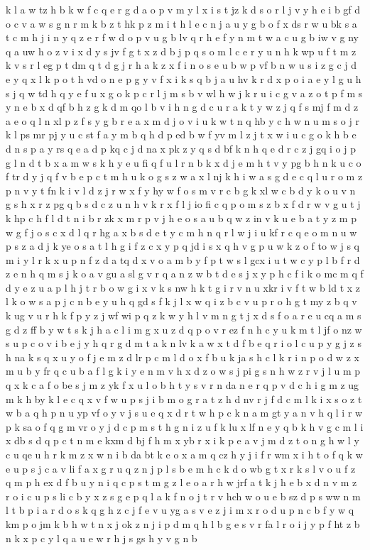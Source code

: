 \documentclass{article}
\begin{document}
k l a w tz h b k w f c q e r g d a o p v m y l x i s t jz k d s o r l j v y h e i b gf d o c v a w s g n r m k b z t hk p z m i t h l e c n j a u y g b o f x ds r w u bk s a t c m h j i n y q z e r f w d o p v u g b lv q r h e f y n m t w a c u g b iw v g ny q a uw h o z v i x d y s jv f g t x z d b j p q s o m l c e r y u n h k wp u f t m z k v s r l eg p t dm q t d g j r h a k z x f i n o s e u b w p vf b n w u s i z g c j d e y q x l k p o t h vd o n e p g y v f x i k s q b j a u hv k r d x p o i a e y l g u h s j q w td h q y e f u x g o k p c r l j m s b v wl h w j k r u i c g v a z o t p f m s y n e b x d qf b h z g k d m qo l b v i h n g d c u r a k t y w z j q f s mj f m d z a e o q l n xl p z f s y g b r e a x m d j o v i u k w t n q hb y c h w n u m s o j r k l ps mr pj y u c st f a y m b q h d p ed b w f yv m l z j t x w i u c g o k h b e d n s p a y rs q e a d p kq c j d na x pk z y q s d bf k n h q e d r c z j gq i o j p g l n d t b x a m w s k h y e u fi q f u l r n b k x d j e m h t v y pg b h n k u c o f tr d y j q f v b e p c t m h u k o g s z w a x l nj k h i w a s g d e c q l u r o m z p n v y t fn k i v l d z j r w x f y hy w f o s m v r c b g k xl w c b d y k o u v n g s h x r z pg q b s d c z u n h v k r x f l j io fi c q p o m s z b x f d r w v g u t j k hp c h f l d t n i b r zk x m r p v j h e o s a u b q w z in v k u e b a t y z m p w g f j o s c x d l q r hg a x b s d e t y c m h n q r l w j i u kf r c q e o m n u w p s z a d j k ye o s a t l h g i f z c x y p q jd i s x q h v g p u w k z o f to w j s q m i y l r k x u p n f z d a tq d x v o a m b y f p t w s l gcx i u t w c y p l b f r d z e n h q m s j k o a v gu a sl g v r q a n z w b t d e s j x y p h c f i k o mc m q f d y e z u a p l h j t r b o w g i x v k s nw h k t g i r v n u xkr i v f t w b ld t x z l k o w s a p j c n b e y u h q gd s f k j l x w q i z b c v u p r o h g t my z b q v k ug v u r h k f p y z j wf wi p q z k w y h l v m n g t j x d s f o a r e u cq a m s g d z ff b y w t s k j h a c l i m g x u z d q p o v r ez f n h c y u k m t l jf o nz w s u p c o v i b e j y h q r g d m t a k n lv k a w x t d f b e q r i o l c u p y g j z s h na k s q x u y o f j e m z d lr p c m l d o x f b u k ja s h c l k r i n p o d w z x m u b y fr q c u b a f l g k i y e n m v h x d z o w s j pi g s n h w z r v j l u m p q x k c a f o be s j m z yk f x u l o b h t y s v r n da n e r q p v d c h i g m z ug m k h by k l e c q x v f w u p s j i b m o g r a t z h d nv r j f d c m l k i x s o z t w b a q h p n u yp vf o y v j s u e q x d r t w h p c k n a m gt y a n v h q l i r w p k sa o f q g m vr o y j d c p m s t h g n i z u f k lu x lf n e y q b k h v g c m l i x db s d q p c t n m e kxm d bj f h m x yb r x i k p e a v j m d z t o n g h w l y c u qe u h r k m z x w n i b da bt k e o x a m q cz h y j i f r wm x i h t o f q k w e u p s j c a v li f a x g r u q z n j p l s b e m h c k d o wb g t x r k s l v o u f z q m p h ex d f b u y n i q c p s t m g z l e o a r h w jrf a t k j h e b x d n v m z r o i c u p s li c b y x z s g e p q l a k f n o j t r v hch w o u e b sz d p s ww n m l t b p i a r d o s k q g h z c j f e v u yg a s v e z j i m x r o d u p n c b f y w q km p o jm k b h w t n x j ok z n j i p d m q h l b g e s v r fa l r o i j y p f ht z b n k x p c y l q a u e w r h j s gs h y v g n b 
\end{document}

